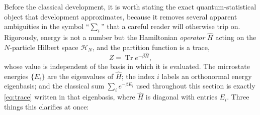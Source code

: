 \documentclass[11pt,a4paper]{article}
\theoremstyle{definition}
\begin{document}
Before the classical development, it is worth stating the exact
quantum-statistical object that development approximates, because it removes
several apparent ambiguities in the symbol ``$\sum_i$'' that a careful reader
will otherwise trip on. Rigorously, energy is not a number but the Hamiltonian
\emph{operator} $\hat H$ acting on the $N$-particle Hilbert space
$\mathcal H_N$, and the partition function is a trace,
\begin{equation}\label{eq:trace}
Z=\operatorname{Tr}e^{-\beta\hat H},
\end{equation}
whose value is independent of the basis in which it is evaluated. The microstate
energies $\{E_i\}$ are the eigenvalues of $\hat H$; the index $i$ labels an
orthonormal energy eigenbasis; and the classical sum $\sum_i e^{-\beta E_i}$
used throughout this section is exactly \eqref{eq:trace} written in that
eigenbasis, where $\hat H$ is diagonal with entries $E_i$. Three things this
clarifies at once:
\end{document}
